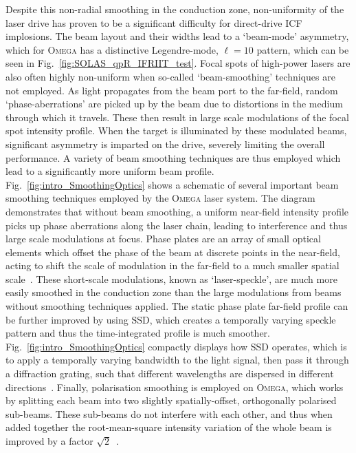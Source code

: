Despite this non-radial smoothing in the conduction zone, non-uniformity of the laser drive has proven to be a significant difficulty for direct-drive \ac{ICF} implosions.
The beam layout and their widths lead to a `beam-mode' asymmetry, which for \textsc{Omega} has a distinctive Legendre-mode, $\ell=10$ pattern, which can be seen in Fig.~\ref{fig:SOLAS_qpR_IFRIIT_test}.
Focal spots of high-power lasers are also often highly non-uniform when so-called `beam-smoothing' techniques are not employed.
As light propagates from the beam port to the far-field, random `phase-aberrations' are picked up by the beam due to distortions in the medium through which it travels.
These then result in large scale modulations of the focal spot intensity profile.
When the target is illuminated by these modulated beams, significant asymmetry is imparted on the drive, severely limiting the overall performance.
A variety of beam smoothing techniques are thus employed which lead to a significantly more uniform beam profile.
Fig.~\ref{fig:intro_SmoothingOptics} shows a schematic of several important beam smoothing techniques employed by the \textsc{Omega} laser system.
The diagram demonstrates that without beam smoothing, a uniform near-field intensity profile picks up phase aberrations along the laser chain, leading to interference and thus large scale modulations at focus.
Phase plates are an array of small optical elements which offset the phase of the beam at discrete points in the near-field, acting to shift the scale of modulation in the far-field to a much smaller spatial scale~\cite{kato_random_1984}.
These short-scale modulations, known as `laser-speckle', are much more easily smoothed in the conduction zone than the large modulations from beams without smoothing techniques applied.
The static phase plate far-field profile can be further improved by using \ac{SSD}, which creates a temporally varying speckle pattern and thus the time-integrated profile is much smoother.
Fig.~\ref{fig:intro_SmoothingOptics} compactly displays how \ac{SSD} operates, which is to apply a temporally varying bandwidth to the light signal, then pass it through a diffraction grating, such that different wavelengths are dispersed in different directions~\cite{skupsky_improved_1989,hohenberger_optical_2016}.
Finally, polarisation smoothing is employed on \textsc{Omega}, which works by splitting each beam into two slightly spatially-offset, orthogonally polarised sub-beams.
These sub-beams do not interfere with each other, and thus when added together the root-mean-square intensity variation of the whole beam is improved by a factor $\sqrt{2}$~\cite{tsubakimoto_suppression_1992,boehly_reduction_1999}.

